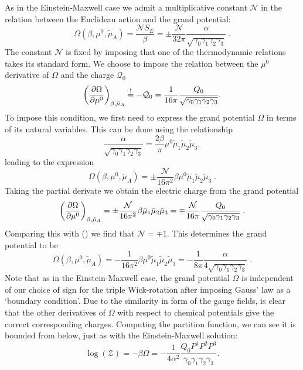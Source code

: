 As in the Einstein-Maxwell case we admit a multiplicative constant $\mathcal{N}$ in the relation between the Euclidean action and the grand potential:
\begin{equation*}
    \Omega(\beta, \mu^0, \tilde{\mu}_A)  = \frac{\mathcal{N} S_E}{\beta} = \pm \frac{\mathcal{N}}{32\pi}\frac{\alpha}{\sqrt{\gamma_0 \gamma_1 \gamma_2 \gamma_3}}  \;.
\end{equation*}
The constant $\mathcal{N}$ is fixed by imposing that one of the thermodynamic relations takes its standard form. We choose
to impose the relation between the $\mu^0$ derivative of $\Omega$ and the charge $\mathcal{Q}_0$
\begin{equation}
\label{Constraint}
\left(\frac{\partial \Omega}{\partial \mu^0} \right)_{\beta,\tilde{\mu}_A} \overset{!}{=} -\mathcal{Q}_0 = \frac{1}{16\pi}\frac{Q_0}{\sqrt{\gamma_0 \gamma_1 \gamma_2 \gamma_3}}.
\end{equation}
To impose this condition, we first need to express the grand potential $\Omega$ in terms of its natural variables. This can be done using the relationship
\begin{equation*}
    \frac{\alpha}{\sqrt{\gamma_0 \gamma_1 \gamma_2 \gamma_3}} = \frac{2\beta}{\pi} \mu^0 \tilde{\mu}_1 \tilde{\mu}_2 \tilde{\mu}_3,
\end{equation*}
leading to the expression
\begin{equation}
    \Omega(\beta,\mu^0,\tilde{\mu}_A) = \pm \frac{\mathcal{N}}{16 \pi^2} 
     \beta \mu^0 \tilde{\mu}_1 \tilde{\mu}_2 \tilde{\mu}_3 \;.
\end{equation}
Taking the partial derivate we obtain the electric charge from the grand potential
\begin{equation*}
        \left(\frac{\partial \Omega}{\partial \mu^0} \right)_{\beta,\tilde{\mu}_A} = \pm 
        \frac{\mathcal{N}}{16 \pi^2} 
        \beta \tilde{\mu}_1 \tilde{\mu}_2 \tilde{\mu}_3 
= \mp \frac{\mathcal{N}}{16 \pi} \frac{Q_0}{\sqrt{\gamma_0 \gamma_1 \gamma_2 \gamma_3}}  \;.
\end{equation*}
Comparing this with () we find that $\mathcal{N}=\mp 1$. This determines the grand potential to be
\begin{equation*}
    \Omega(\beta, \mu^0,\tilde{\mu}_A) = - \frac{1}{16 \pi^2} \beta \mu^0 \tilde{\mu}_1 \tilde{\mu}_2 \tilde{\mu}_3 = 
    -\frac{1}{8\pi} \frac{\alpha}{4\sqrt{\gamma_0 \gamma_1 \gamma_2 \gamma_3}}  \;.
\end{equation*}
Note that as in the Einstein-Maxwell case, the grand potential $\Omega$ is independent of our choice of sign for the triple Wick-rotation after imposing Gauss' law as a `boundary condition'. Due to the similarity in form of the gauge fields, is clear that the other derivatives of $\Omega$ with respect to chemical potentials give the correct corresponding charges. Computing the partition function, we can see it is bounded from below, just as with the Einstein-Maxwell solution:
\begin{equation*}
	\log \left( \mathcal{Z} \right) = - \beta \Omega = - \frac{1}{4 \alpha^2} \frac{Q_0 P^1 P^2 P^3}{\gamma_0 \gamma_1 \gamma_2 \gamma_3}.
\end{equation*} 

